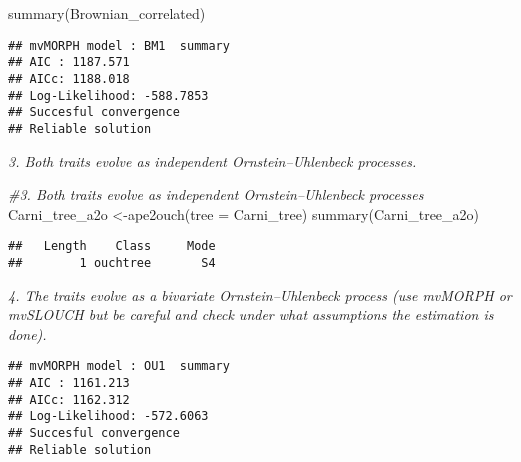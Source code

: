 \documentclass[
]{article}
\newenvironment{Shaded}{\begin{snugshade}}{\end{snugshade}}
\newcommand{\AttributeTok}[1]{\textcolor[rgb]{0.77,0.63,0.00}{#1}}
\newcommand{\CommentTok}[1]{\textcolor[rgb]{0.56,0.35,0.01}{\textit{#1}}}
\newcommand{\ConstantTok}[1]{\textcolor[rgb]{0.00,0.00,0.00}{#1}}
\newcommand{\FunctionTok}[1]{\textcolor[rgb]{0.00,0.00,0.00}{#1}}
\newcommand{\NormalTok}[1]{#1}
\newcommand{\OtherTok}[1]{\textcolor[rgb]{0.56,0.35,0.01}{#1}}
\newcommand{\SpecialCharTok}[1]{\textcolor[rgb]{0.00,0.00,0.00}{#1}}
\newcommand{\StringTok}[1]{\textcolor[rgb]{0.31,0.60,0.02}{#1}}
\begin{document}
\begin{Shaded}
\begin{Highlighting}[]
\FunctionTok{summary}\NormalTok{(Brownian\_correlated)}
\end{Highlighting}
\end{Shaded}

\begin{verbatim}
## mvMORPH model : BM1  summary 
## AIC : 1187.571 
## AICc: 1188.018 
## Log-Likelihood: -588.7853 
## Succesful convergence 
## Reliable solution
\end{verbatim}

\emph{3. Both traits evolve as independent Ornstein--Uhlenbeck
processes.}

\begin{Shaded}
\begin{Highlighting}[]
\CommentTok{\#3. Both traits evolve as independent Ornstein–Uhlenbeck processes}
\NormalTok{Carni\_tree\_a2o }\OtherTok{\textless{}{-}}\FunctionTok{ape2ouch}\NormalTok{(}\AttributeTok{tree =}\NormalTok{ Carni\_tree)}
\FunctionTok{summary}\NormalTok{(Carni\_tree\_a2o)}
\end{Highlighting}
\end{Shaded}

\begin{verbatim}
##   Length    Class     Mode 
##        1 ouchtree       S4
\end{verbatim}

\emph{4. The traits evolve as a bivariate Ornstein--Uhlenbeck process
(use mvMORPH or mvSLOUCH but be careful and check under what assumptions
the estimation is done).}

\begin{Shaded}
\end{Shaded}

\begin{verbatim}
## mvMORPH model : OU1  summary 
## AIC : 1161.213 
## AICc: 1162.312 
## Log-Likelihood: -572.6063 
## Succesful convergence 
## Reliable solution
\end{verbatim}
\end{document}
